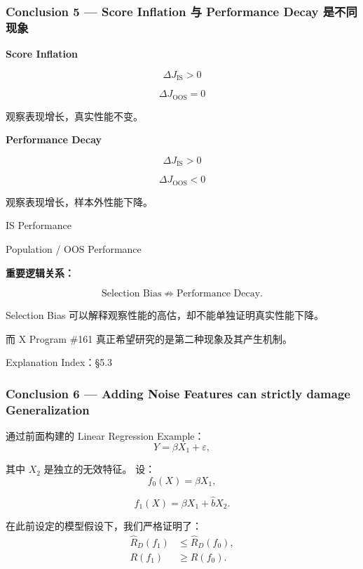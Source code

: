 \hypertarget{part-1-10-0001-conclusion-5-score-inflation-ux4e0e-performance-decay-ux662fux4e0dux540cux73b0ux8c61}{%
\subsubsection{Conclusion 5 --- Score Inflation 与 Performance Decay 是不同现象}\label{part-1-10-0001-conclusion-5-score-inflation-ux4e0e-performance-decay-ux662fux4e0dux540cux73b0ux8c61}}

\textbf{Score Inflation}


\[\Delta J_{\mathrm{IS}}>0\]

\[\Delta J_{\mathrm{OOS}}=0\]

观察表现增长，真实性能不变。

\textbf{Performance Decay}


\[\Delta J_{\mathrm{IS}}>0\]

\[\Delta J_{\mathrm{OOS}}<0\]

观察表现增长，样本外性能下降。

IS Performance

Population / OOS Performance

\textbf{重要逻辑关系：}

\[\text{Selection Bias}
\not\Rightarrow
\text{Performance Decay}.\]

Selection Bias 可以解释观察性能的高估，却不能单独证明真实性能下降。

而 X Program \#161 真正希望研究的是第二种现象及其产生机制。

Explanation Index：§5.3

\hypertarget{part-1-10-0001-conclusion-6-adding-noise-features-can-strictly-damage-generalization}{%
\subsubsection{Conclusion 6 --- Adding Noise Features can strictly damage Generalization}\label{part-1-10-0001-conclusion-6-adding-noise-features-can-strictly-damage-generalization}}

通过前面构建的 Linear Regression Example：
\[Y=\beta X_1+\varepsilon,\]

其中 \(X_2\) 是独立的无效特征。 设：
\[f_0(X)=\beta X_1,\]

\[f_1(X)=\beta X_1+\hat bX_2.\]

在此前设定的模型假设下，我们严格证明了：
\[\boxed{
\begin{aligned}
\widehat R_D(f_1)
&\leq\widehat R_D(f_0),\\
R(f_1)&\geq R(f_0).
\end{aligned}
}\]

